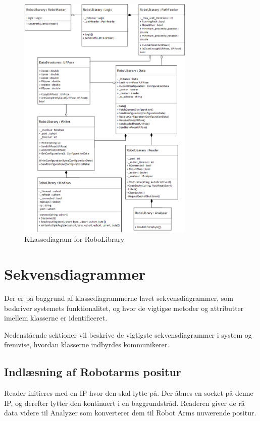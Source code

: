 \begin{figure}[H]
    \centering
    \includegraphics[width=0.75\textwidth]{figurer/d/Design/Class/uml_class_robolibrary}
    \caption{KLassediagram for RoboLibrary}
    \label{class_RoboLib}
\end{figure}

\newpage
\section{Sekvensdiagrammer}
Der er på baggrund af klassediagrammerne lavet sekvensdiagrammer, som beskriver systemets funktionalitet, og hvor de vigtigse metoder og attributter imellem klasserne er identificeret.

Nedenstående sektioner vil beskrive de vigtigste sekvensdiagrammer i system og fremvise, hvordan klasserne indbyrdes kommunikerer. 

\subsection{Indlæsning af Robotarms positur} 
Reader initieres med en IP hvor den skal lytte på. 
Der åbnes en socket på denne IP, og derefter lytter den kontinuert i en baggrundstråd. 
Readeren giver de rå data videre til Analyzer som konverterer dem til Robot Arms nuværende positur.

